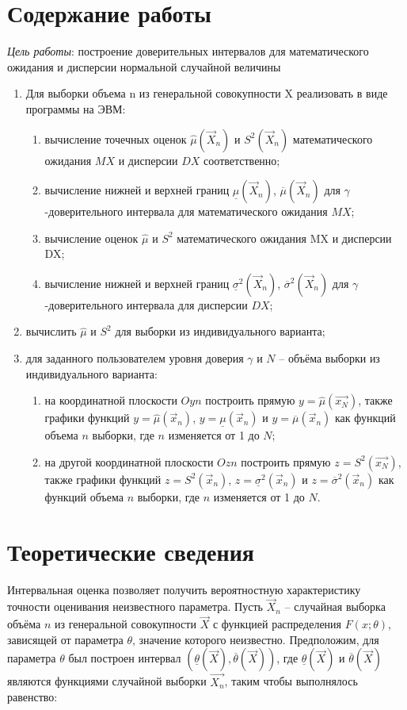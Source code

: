 \chapter{Содержание работы}
\textit{Цель работы}:  построение доверительных интервалов для математического ожидания и дисперсии нормальной случайной величины
\begin{enumerate}[wide=0pt]
	\item Для выборки объема n из генеральной совокупности X реализовать в виде программы на ЭВМ:
	\begin{enumerate}
		\item вычисление точечных оценок $\hat\mu(\vec X_n)$ и $S^2(\vec X_n)$ математического ожидания $MX$ и дисперсии $DX$ соответственно;
		\item вычисление нижней и верхней границ $\underline\mu(\vec X_n)$, $\overline\mu(\vec X_n)$ для $\gamma$-доверительного интервала для математического ожидания $MX$;
		\item вычисление оценок $\hat{\mu}$ и $S^2$ математического ожидания MX и дисперсии DX;
		\item вычисление нижней и верхней границ $\underline\sigma^2(\vec X_n)$, $\overline\sigma^2(\vec X_n)$ для $\gamma$-доверительного интервала для дисперсии $DX$;
	\end{enumerate}
	\item вычислить $\hat\mu$ и $S^2$ для выборки из индивидуального варианта;
	\item для заданного пользователем уровня доверия $\gamma$ и $N$ – объёма выборки из индивидуального варианта:
	\begin{enumerate}
		\item на координатной плоскости $Oyn$ построить прямую $y = \hat\mu(\vec{x_N})$, также графики функций $y = \hat\mu(\vec x_n)$, $y = \underline\mu(\vec x_n)$ и $y = \overline\mu(\vec x_n)$ как функций объема $n$ выборки, где $n$ изменяется от 1 до $N$;
		\item на другой координатной плоскости $Ozn$ построить прямую $z = S^2(\vec{x_N})$, также графики функций $z = S^2(\vec x_n)$, $z = \underline\sigma^2(\vec x_n)$ и $z = \overline\sigma^2(\vec x_n)$ как функций объема $n$ выборки, где $n$ изменяется от 1 до $N$.
	\end{enumerate}
\end{enumerate}

\chapter{Теоретические сведения}
Интервальная оценка позволяет получить вероятностную характеристику точности оценивания неизвестного параметра.
Пусть $\vec X_n$ -- случайная выборка объёма $n$ из генеральной совокупности $\vec{X}$ с функцией распределения $F(x; \theta)$, зависящей от параметра $\theta$, значение которого неизвестно. Предположим, для параметра  $\theta$ был построен интервал $(\underline{\theta}(\vec{X}), \overline{\theta}(\vec{X}))$, где $\underline{\theta}(\vec{X})$ и $\overline{\theta}(\vec{X})$ являются функциями случайной выборки $\vec{X_n}$, таким чтобы выполнялось равенство: 

